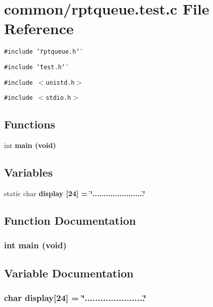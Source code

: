\section{common/rptqueue.test.c File Reference}
\label{rptqueue_8test_8c}
{\tt \#include \char`\"{}rptqueue.h\char`\"{}}\par
{\tt \#include \char`\"{}test.h\char`\"{}}\par
{\tt \#include $<$unistd.h$>$}\par
{\tt \#include $<$stdio.h$>$}\par
\subsection*{Functions}
\begin{CompactItemize}
\item 
int \bf{main} (void)
\end{CompactItemize}
\subsection*{Variables}
\begin{CompactItemize}
\item 
static char \bf{display} [24] = \char`\"{}.......................\char`\"{}
\end{CompactItemize}


\subsection{Function Documentation}
\subsubsection{\setlength{\rightskip}{0pt plus 5cm}int main (void)}\label{rptqueue_8test_8c_5ad1c26f00c2399d3a5c7850100212d0}




\subsection{Variable Documentation}
\subsubsection{\setlength{\rightskip}{0pt plus 5cm}char \bf{display}[24] = \char`\"{}.......................\char`\"{}\hspace{0.3cm}{\tt  [static]}}\label{rptqueue_8test_8c_1b4a24ddecf8441d42ce3b08656c0823}


